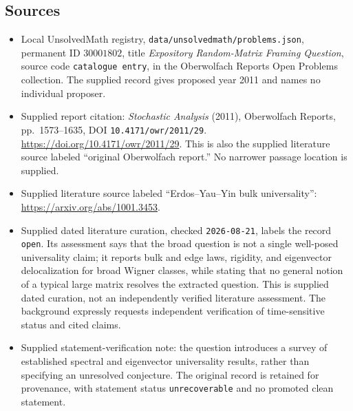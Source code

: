 \documentclass[11pt]{article}
\begin{document}
\subsection{Sources}
\begin{itemize}
\item Local UnsolvedMath registry, \texttt{data/unsolvedmath/problems.json}, permanent ID \(30001802\), title \emph{Expository Random-Matrix Framing Question}, source code \texttt{catalogue entry}, in the Oberwolfach Reports Open Problems collection. The supplied record gives proposed year 2011 and names no individual proposer.
\item Supplied report citation: \emph{Stochastic Analysis} (2011), Oberwolfach Reports, pp.\ 1573--1635, DOI \texttt{10.4171/owr/2011/29}. \url{https://doi.org/10.4171/owr/2011/29}. This is also the supplied literature source labeled ``original Oberwolfach report.'' No narrower passage location is supplied.
\item Supplied literature source labeled ``Erdos--Yau--Yin bulk universality'': \url{https://arxiv.org/abs/1001.3453}.
\item Supplied dated literature curation, checked \texttt{2026-08-21}, labels the record \texttt{open}. Its assessment says that the broad question is not a single well-posed universality claim; it reports bulk and edge laws, rigidity, and eigenvector delocalization for broad Wigner classes, while stating that no general notion of a typical large matrix resolves the extracted question. This is supplied dated curation, not an independently verified literature assessment. The background expressly requests independent verification of time-sensitive status and cited claims.
\item Supplied statement-verification note: the question introduces a survey of established spectral and eigenvector universality results, rather than specifying an unresolved conjecture. The original record is retained for provenance, with statement status \texttt{unrecoverable} and no promoted clean statement.
\end{itemize}
\end{document}
